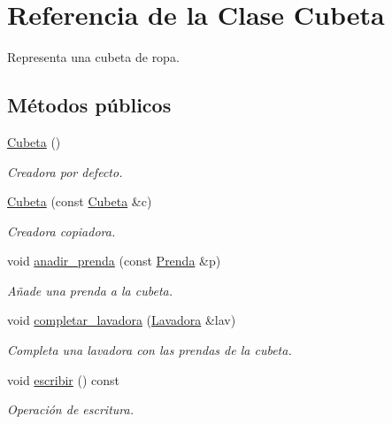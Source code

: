 \hypertarget{class_cubeta}{}\section{Referencia de la Clase Cubeta}
\label{class_cubeta}


Representa una cubeta de ropa.  


\subsection*{Métodos públicos}
\begin{DoxyCompactItemize}
\item 
\mbox{\hyperlink{class_cubeta_ae85e70c9cd67454446439891e3f435e1}{Cubeta}} ()
\begin{DoxyCompactList}\small\item\em Creadora por defecto. \end{DoxyCompactList}\item 
\mbox{\hyperlink{class_cubeta_a9615e48038899c5732f61661585f12c7}{Cubeta}} (const \mbox{\hyperlink{class_cubeta}{Cubeta}} \&c)
\begin{DoxyCompactList}\small\item\em Creadora copiadora. \end{DoxyCompactList}\item 
void \mbox{\hyperlink{class_cubeta_a431873df8f99cebe56b4787a5271e395}{anadir\+\_\+prenda}} (const \mbox{\hyperlink{class_prenda}{Prenda}} \&p)
\begin{DoxyCompactList}\small\item\em Añade una prenda a la cubeta. \end{DoxyCompactList}\item 
void \mbox{\hyperlink{class_cubeta_a60a5a4f4133ce02f1e4fe49bbe8b9ec7}{completar\+\_\+lavadora}} (\mbox{\hyperlink{class_lavadora}{Lavadora}} \&lav)
\begin{DoxyCompactList}\small\item\em Completa una lavadora con las prendas de la cubeta. \end{DoxyCompactList}\item 
void \mbox{\hyperlink{class_cubeta_a3153ac390389f689bead058cd0b1690e}{escribir}} () const
\begin{DoxyCompactList}\small\item\em Operación de escritura. \end{DoxyCompactList}\end{DoxyCompactItemize}


